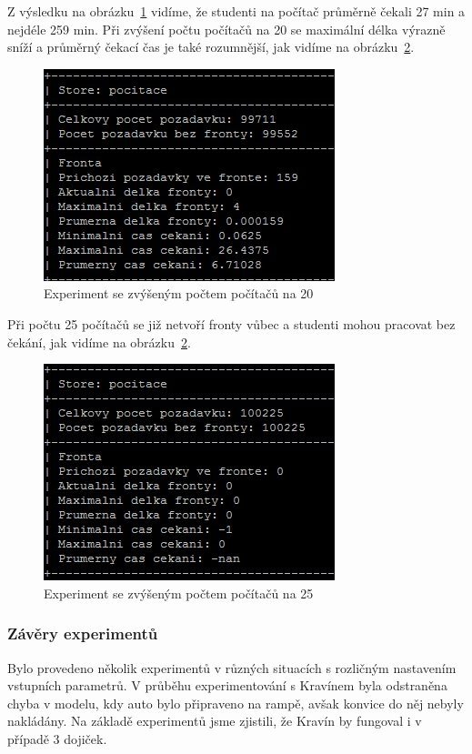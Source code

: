 \documentclass[12pt,a4paper,titlepage,final]{article}
\begin{document}
Z výsledku na obrázku~\ref{obr4} vidíme, že studenti na počítač průměrně čekali 27 min a nejdéle 259 min. Při zvýšení počtu počítačů na 20 se maximální délka výrazně sníží a průměrný čekací čas je také rozumnější, jak vidíme na obrázku~\ref{obr5}.

\begin{figure}[!h] 
 	\centering
	 \includegraphics[]{ucebna2.jpg}
\caption{Experiment se zvýšeným počtem počítačů na 20}
\label{obr4}
\end{figure}

Při počtu 25 počítačů se již netvoří fronty vůbec a studenti mohou pracovat bez čekání, jak vidíme na obrázku~\ref{obr5}.

\begin{figure}[!h] 
 	\centering
	 \includegraphics[]{ucebna3.jpg} 
\caption{Experiment se zvýšeným počtem počítačů na 25}
\label{obr5}
\end{figure}

\subsubsection{Závěry experimentů}

Bylo provedeno několik experimentů v různých situacích s rozličným nastavením vstupních parametrů. V průběhu experimentování s Kravínem byla odstraněna chyba v modelu, kdy auto bylo připraveno na rampě,  avšak konvice do něj nebyly nakládány.  Na základě experimentů jsme zjistili, že Kravín by fungoval i v případě 3 dojiček.
\end{document}
